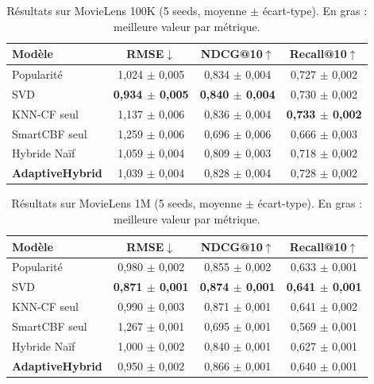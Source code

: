\documentclass[conference]{IEEEtran}
\begin{document}
\begin{table}[!t]
\renewcommand{\arraystretch}{1.2}
\caption{Résultats sur MovieLens 100K (5 seeds, moyenne $\pm$ écart-type).
En gras : meilleure valeur par métrique.}
\label{tab:ml100k}
\centering
\begin{tabular}{@{}lccc@{}}
\toprule
\textbf{Modèle} & \textbf{RMSE}$\downarrow$ & \textbf{NDCG@10}$\uparrow$ & \textbf{Recall@10}$\uparrow$ \\
\midrule
Popularité         & 1,024 $\pm$ 0,005 & 0,834 $\pm$ 0,004 & 0,727 $\pm$ 0,002 \\
SVD                & \textbf{0,934 $\pm$ 0,005} & \textbf{0,840 $\pm$ 0,004} & 0,730 $\pm$ 0,002 \\
KNN-CF seul        & 1,137 $\pm$ 0,006 & 0,836 $\pm$ 0,004 & \textbf{0,733 $\pm$ 0,002} \\
SmartCBF seul      & 1,259 $\pm$ 0,006 & 0,696 $\pm$ 0,006 & 0,666 $\pm$ 0,003 \\
Hybride Naïf       & 1,059 $\pm$ 0,004 & 0,809 $\pm$ 0,003 & 0,718 $\pm$ 0,002 \\
\textbf{AdaptiveHybrid} & 1,039 $\pm$ 0,004 & 0,828 $\pm$ 0,004 & 0,728 $\pm$ 0,002 \\
\bottomrule
\end{tabular}
\end{table}

\begin{table}[!t]
\renewcommand{\arraystretch}{1.2}
\caption{Résultats sur MovieLens 1M (5 seeds, moyenne $\pm$ écart-type).
En gras : meilleure valeur par métrique.}
\label{tab:ml1m}
\centering
\begin{tabular}{@{}lccc@{}}
\toprule
\textbf{Modèle} & \textbf{RMSE}$\downarrow$ & \textbf{NDCG@10}$\uparrow$ & \textbf{Recall@10}$\uparrow$ \\
\midrule
Popularité         & 0,980 $\pm$ 0,002 & 0,855 $\pm$ 0,002 & 0,633 $\pm$ 0,001 \\
SVD                & \textbf{0,871 $\pm$ 0,001} & \textbf{0,874 $\pm$ 0,001} & \textbf{0,641 $\pm$ 0,001} \\
KNN-CF seul        & 0,990 $\pm$ 0,003 & 0,871 $\pm$ 0,001 & 0,641 $\pm$ 0,002 \\
SmartCBF seul      & 1,267 $\pm$ 0,001 & 0,695 $\pm$ 0,001 & 0,569 $\pm$ 0,001 \\
Hybride Naïf       & 1,000 $\pm$ 0,002 & 0,840 $\pm$ 0,001 & 0,627 $\pm$ 0,001 \\
\textbf{AdaptiveHybrid} & 0,950 $\pm$ 0,002 & 0,866 $\pm$ 0,001 & 0,640 $\pm$ 0,001 \\
\bottomrule
\end{tabular}
\end{table}
\end{document}

